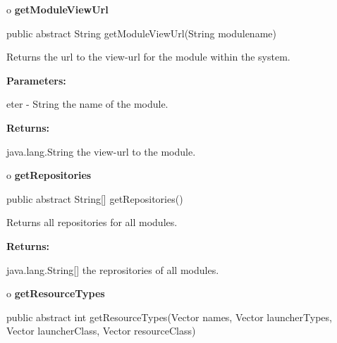 o {\bf getModuleViewUrl} 

\begin{PRE}
 public abstract String getModuleViewUrl(String modulename)
\end{PRE}

\begin{description}
\htmlDD Returns the url to the view-url for the module within the system. 

\begin{description}
\item {\bf Parameters:}  

eter - String the name of the module.  
\item {\bf Returns:}  

java.lang.String the view-url to the module.  
\end{description}

\end{description}

o {\bf getRepositories} 

\begin{PRE}
 public abstract String[] getRepositories()
\end{PRE}

\begin{description}
\htmlDD Returns all repositories for all modules. 

\begin{description}
\item {\bf Returns:}  

java.lang.String[] the reprositories of all modules.  
\end{description}

\end{description}

o {\bf getResourceTypes} 

\begin{PRE}
 public abstract int getResourceTypes(Vector names,
                                      Vector launcherTypes,
                                      Vector launcherClass,
                                      Vector resourceClass)
\end{PRE}

